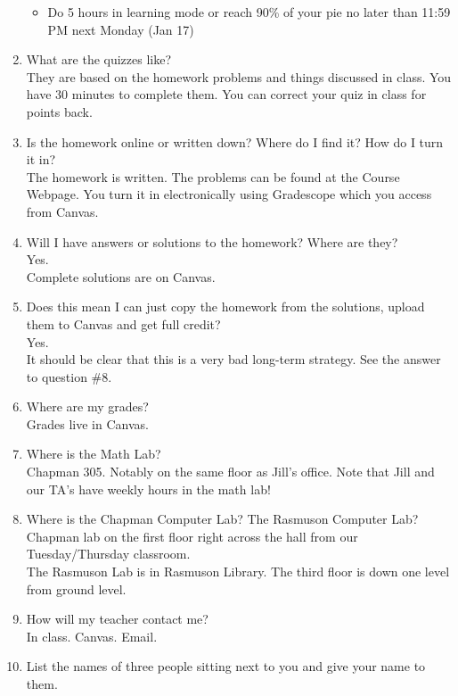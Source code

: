 \documentclass[11pt,fleqn]{article}
\begin{document}
\begin{enumerate}
\begin{itemize}
\item Do 5 hours in learning mode or reach 90\% of your pie no later than 11:59 PM next Monday (Jan 17)
\end{itemize}
\vfill
\item What are the quizzes like?\\
They are based on the homework problems and things discussed in class. You have 30 minutes to complete them. You can correct your quiz in class for points back.
\vfill
\item Is the homework online or written down? Where do I find it? How do I turn it in?\\

The homework is written. The problems can be found at the Course Webpage. You turn it in electronically using Gradescope which you access from Canvas.
\vfill
\item Will I have answers or solutions to the homework? Where are they?\\

Yes. \\
Complete solutions are on Canvas.
\vfill
\item Does this mean I can just copy the homework from the solutions, upload them to Canvas and get full credit? \\

Yes. \\
It should be clear that this is a very bad long-term strategy. See the answer to question \#8.
\vfill



\item Where are my grades?\\
Grades live in Canvas.
\vfill

\item Where is the Math Lab?\\
Chapman 305. Notably on the same floor as Jill's office. Note that Jill and our TA's have weekly hours in the math lab!
\vfill

\item Where is the Chapman Computer Lab? The Rasmuson Computer Lab?\\
Chapman lab on the first floor right across the hall from our Tuesday/Thursday classroom.\\
The Rasmuson Lab is in Rasmuson Library. The third floor is down one level from ground level.
\vfill

\item How will my teacher contact me? \\
In class. Canvas. Email.
\vfill
\item List the names of three people sitting next to you and give your name to them.
\vfill
\end{enumerate}
\end{document}
